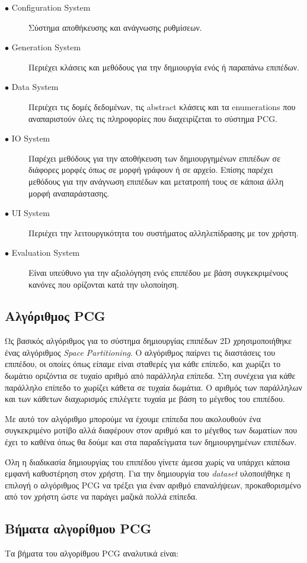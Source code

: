 \begin{description}
\item[$\bullet$ Configuration System] Σύστημα αποθήκευσης και ανάγνωσης ρυθμίσεων.
\item[$\bullet$ Generation System] Περιέχει κλάσεις και μεθόδους για την δημιουργία ενός ή παραπάνω επιπέδων.
\item[$\bullet$ Data System] Περιέχει τις δομές δεδομένων, τις abstract κλάσεις και τα enumerations που αναπαριστούν όλες τις πληροφορίες που διαχειρίζεται το σύστημα PCG.
\item[$\bullet$ IO System] Παρέχει μεθόδους για την αποθήκευση των δημιουργημένων επιπέδων σε διάφορες μορφές όπως σε μορφή γράφουν ή σε αρχείο. Επίσης παρέχει μεθόδους για την ανάγνωση επιπέδων και μετατροπή τους σε κάποια άλλη μορφή αναπαράστασης.
\item[$\bullet$ UI System] Περιέχει την λειτουργικότητα του συστήματος αλληλεπίδρασης με τον χρήστη.
\item[$\bullet$ Evaluation System] Είναι υπεύθυνο για την αξιολόγηση ενός επιπέδου με βάση συγκεκριμένους κανόνες που ορίζονται κατά την υλοποίηση.
\end{description}

\subsection{Αλγόριθμος PCG}
Ως βασικός αλγόριθμος για το σύστημα δημιουργίας επιπέδων 2D χρησιμοποιήθηκε ένας αλγόριθμος \textit{Space Partitioning}. O αλγόριθμος παίρνει τις διαστάσεις του επιπέδου, οι οποίες όπως είπαμε είναι σταθερές για κάθε επίπεδο, και χωρίζει το δωμάτιο οριζόντια σε τυχαίο αριθμό από παράλληλα επίπεδα. Στη συνέχεια για κάθε παράλληλο επίπεδο το χωρίζει κάθετα σε τυχαία δωμάτια. Ο αριθμός των παράλληλων και των κάθετων διαχωρισμός επιλέγετε τυχαία με βάση το μέγεθος του επιπέδου.
\par
Με αυτό τον αλγόριθμο μπορούμε να έχουμε επίπεδα που ακολουθούν ένα συγκεκριμένο μοτίβο αλλά διαφέρουν στον αριθμό και το μέγεθος των δωματίων που έχει το καθένα όπως θα δούμε και στα παραδείγματα των δημιουργημένων επιπέδων.
\par
Όλη η διαδικασία δημιουργίας του επιπέδου γίνετε άμεσα χωρίς να υπάρχει κάποια εμφανή καθυστέρηση στον χρήστη. Για την δημιουργία του \textit{dataset} υλοποιήθηκε η επιλογή ο αλγόριθμος PCG να τρέξει για έναν αριθμό επαναλήψεων, προκαθορισμένο από τον χρήστη ώστε να παράγει μαζικά πολλά επίπεδα.

\subsection{Βήματα αλγορίθμου PCG}
Τα βήματα του αλγορίθμου PCG αναλυτικά είναι:

